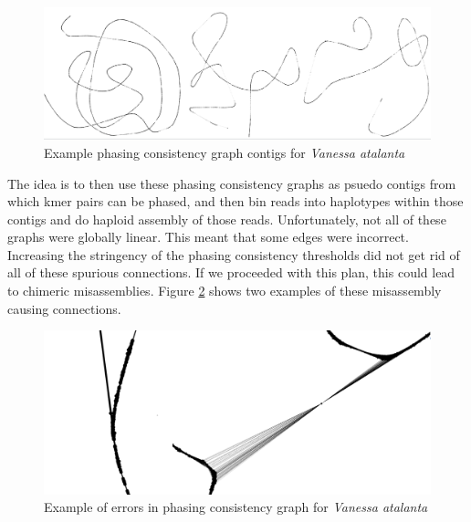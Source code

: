 \begin{figure}[htbp!]
\caption{Example phasing consistency graph contigs for \textit{Vanessa atalanta}}
\label{figure:phasegraph}
\begin{centering}
\includegraphics[width=\textwidth]{phasinggraph.png}
\end{centering}
\end{figure}

\par{
The idea is to then use these phasing consistency graphs as psuedo contigs from which kmer pairs can be phased, and then bin reads into haplotypes within those contigs and do haploid assembly of those reads. Unfortunately, not all of these graphs were globally linear. This meant that some edges were incorrect. Increasing the stringency of the phasing consistency thresholds did not get rid of all of these spurious connections. If we proceeded with this plan, this could lead to chimeric misassemblies. Figure \ref{figure:misassemblygraph} shows two examples of these misassembly causing connections.
}

\begin{figure}[htbp!]
\caption{Example of errors in phasing consistency graph for \textit{Vanessa atalanta}}
\label{figure:misassemblygraph}
\begin{centering}
\includegraphics[width=\textwidth]{misassemblyphase.png}
\end{centering}
\end{figure}

